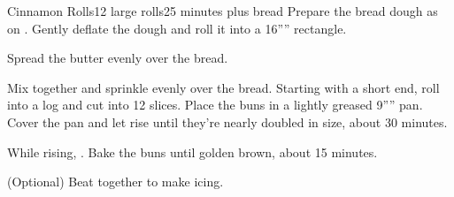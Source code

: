 \documentclass[../Cookbook.tex]{subfiles}
\begin{document}
\begin{recipe}[CinnamonRolls]{Cinnamon Rolls}{12 large rolls}{25 minutes plus bread}
	Prepare the bread dough as on .
	Gently deflate the dough and roll it into a 16'''' rectangle.

	Spread the butter evenly over the bread.

	Mix together and sprinkle evenly over the bread.
	Starting with a short end, roll into a log and cut into 12 slices.
	Place the buns in a lightly greased 9'''' pan.
	Cover the pan and let rise until they're nearly doubled in size, about 30 minutes.

	While rising, .
	Bake the buns until golden brown, about 15 minutes.

	(Optional) Beat together to make icing.
\end{recipe}
\end{document}

